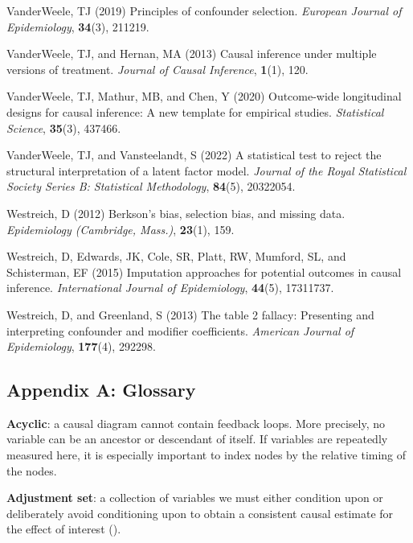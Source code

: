 \documentclass[
  singlecolumn]{article}
\newlength{\cslhangindent}
\newenvironment{CSLReferences}[2] %
 {\begin{list}{}{%
  \setlength{\itemindent}{0pt}
  \setlength{\leftmargin}{0pt}
  \setlength{\parsep}{0pt}
  \ifodd #1
   \setlength{\leftmargin}{\cslhangindent}
   \setlength{\itemindent}{-1\cslhangindent}
  \fi
  \setlength{\itemsep}{#2\baselineskip}}}
 {\end{list}}
\begin{document}
\begin{CSLReferences}{1}{0}
VanderWeele, TJ (2019) Principles of confounder selection.
\emph{European Journal of Epidemiology}, \textbf{34}(3), 211219.

VanderWeele, TJ, and Hernan, MA (2013) Causal inference under multiple
versions of treatment. \emph{Journal of Causal Inference},
\textbf{1}(1), 120.

VanderWeele, TJ, Mathur, MB, and Chen, Y (2020) Outcome-wide
longitudinal designs for causal inference: A new template for empirical
studies. \emph{Statistical Science}, \textbf{35}(3), 437466.

VanderWeele, TJ, and Vansteelandt, S (2022) A statistical test to reject
the structural interpretation of a latent factor model. \emph{Journal of
the Royal Statistical Society Series B: Statistical Methodology},
\textbf{84}(5), 20322054.

Westreich, D (2012) Berkson's bias, selection bias, and missing data.
\emph{Epidemiology (Cambridge, Mass.)}, \textbf{23}(1), 159.

Westreich, D, Edwards, JK, Cole, SR, Platt, RW, Mumford, SL, and
Schisterman, EF (2015) Imputation approaches for potential outcomes in
causal inference. \emph{International Journal of Epidemiology},
\textbf{44}(5), 17311737.

Westreich, D, and Greenland, S (2013) The table 2 fallacy: Presenting
and interpreting confounder and modifier coefficients. \emph{American
Journal of Epidemiology}, \textbf{177}(4), 292298.

\end{CSLReferences}

\subsection{Appendix A: Glossary}\label{appendix-a-glossary}

\textbf{Acyclic}: a causal diagram cannot contain feedback loops. More
precisely, no variable can be an ancestor or descendant of itself. If
variables are repeatedly measured here, it is especially important to
index nodes by the relative timing of the nodes.

\textbf{Adjustment set}: a collection of variables we must either
condition upon or deliberately avoid conditioning upon to obtain a
consistent causal estimate for the effect of interest
().
\end{document}
